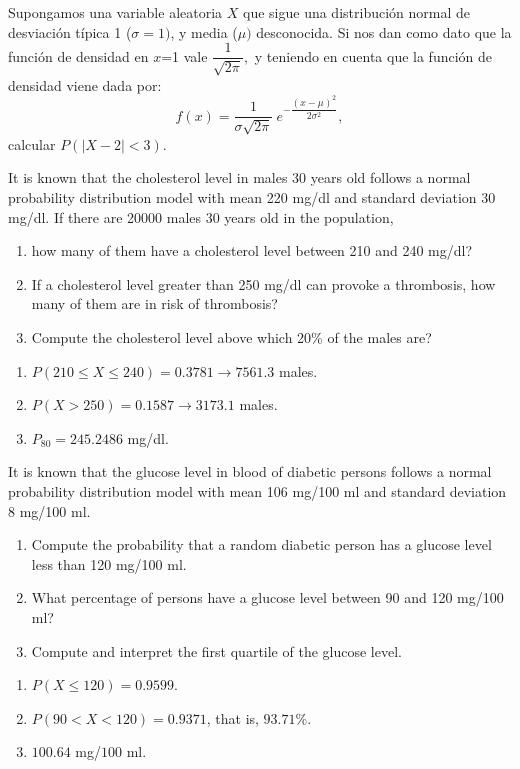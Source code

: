 {Supongamos una variable aleatoria $X$ que sigue una distribución normal de desviación típica 1 ($\sigma =1)$, y media ($\mu )$ desconocida. Si nos dan como dato que la función de densidad en $x$=1 vale $\dfrac{1}{\sqrt{2\pi }},$ y teniendo en cuenta que la función de densidad viene dada por:
\[
f(x)=\dfrac{1}{\sigma \sqrt{2\pi }}\ e^{-\dfrac{(x-\mu )^{2}}{2\sigma ^{2}}},
\]
calcular $P(\left| X-2\right| <3)$.
}
{}
{}


{It is known that the cholesterol level in males 30 years old follows a normal probability distribution model with mean 220 mg/dl and standard deviation 30 mg/dl. 
If there are 20000 males 30 years old in the population,
\begin{enumerate}
\item how many of them have a cholesterol level between 210 and 240 mg/dl?
\item If a cholesterol level greater than 250 mg/dl can provoke a thrombosis, how many of them are in risk of thrombosis?
\item Compute the cholesterol level above which 20\% of the males are?
\end{enumerate}
}
{
\begin{enumerate}
\item $P(210\leq X\leq 240)=0.3781\rightarrow 7561.3$ males. 
\item $P(X>250)=0.1587\rightarrow 3173.1$ males. 
\item $P_{80}=245.2486$ mg/dl. 
\end{enumerate}
}
{}


{It is known that the glucose level in blood of diabetic persons follows a normal probability distribution model with
mean 106 mg/100 ml and standard deviation 8 mg/100 ml.
\begin{enumerate}
\item Compute the probability that a random diabetic person has a glucose level less than 120 mg/100 ml. 
\item What percentage of persons have a glucose level between 90 and 120 mg/100 ml?
\item Compute and interpret the first quartile of the glucose level. 
\end{enumerate}
}
{
\begin{enumerate}
\item $P(X\leq 120)=0.9599$.
\item $P(90< X<120)=0.9371$, that is, $93.71\%$.
\item $100.64$ mg/$100$ ml. 
\end{enumerate}
}
{}


